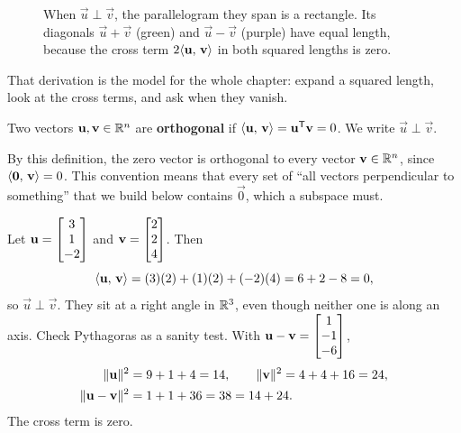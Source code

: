 \begin{figure}[htbp]
\centering
{}
\caption{When $\vec u\perp\vec v$, the parallelogram they span is a rectangle. Its diagonals
$\vec u+\vec v$ (green) and $\vec u-\vec v$ (purple) have equal length, because the cross term
$2\langle \mathbf{u},\, \mathbf{v} \rangle$ in both squared lengths is zero.}
\label{ch17:rectangle-diagonals}
\end{figure}

That derivation is the model for the whole chapter: expand a squared length, look at the
cross terms, and ask when they vanish.

\begin{definition}\label{ch17:def-orthogonal-vectors}
Two vectors $\mathbf{u},\mathbf{v}\in\mathbb{R}^n$ are \textbf{orthogonal} if $\langle \mathbf{u},\, \mathbf{v} \rangle
= \mathbf{u}^{\mathsf{T}}\mathbf{v} = 0$. We write $\vec{u}\perp\vec{v}$.
\end{definition}

\begin{remark}
By this definition, the zero vector is orthogonal to every vector $\mathbf{v}\in\mathbb{R}^n$,
since $\langle \mathbf{0},\, \mathbf{v} \rangle = 0$. This convention means that every set of
``all vectors perpendicular to something'' that we build below contains $\vec{0}$,
which a subspace must.
\end{remark}

\begin{example}\label{ch17:first-numeric}
Let $\mathbf{u}=\begin{bmatrix}3\\1\\-2\end{bmatrix}$ and $\mathbf{v}=\begin{bmatrix}2\\2\\4\end{bmatrix}$. Then
\[
  \langle \mathbf{u},\, \mathbf{v} \rangle = (3)(2)+(1)(2)+(-2)(4) = 6+2-8 = 0,
\]
so $\vec{u}\perp\vec{v}$. They sit at a right angle in $\mathbb{R}^3$, even though neither one is
along an axis. Check Pythagoras as a sanity test. With $\mathbf{u}-\mathbf{v}=\begin{bmatrix}1\\-1\\-6\end{bmatrix}$,
\begin{align*}
  \lVert\mathbf{u}\rVert^2 &= 9+1+4 = 14, \qquad \lVert\mathbf{v}\rVert^2 = 4+4+16 = 24,\\
  \lVert\mathbf{u}-\mathbf{v}\rVert^2 &= 1+1+36 = 38 = 14+24.
\end{align*}
The cross term is zero.
\end{example}

